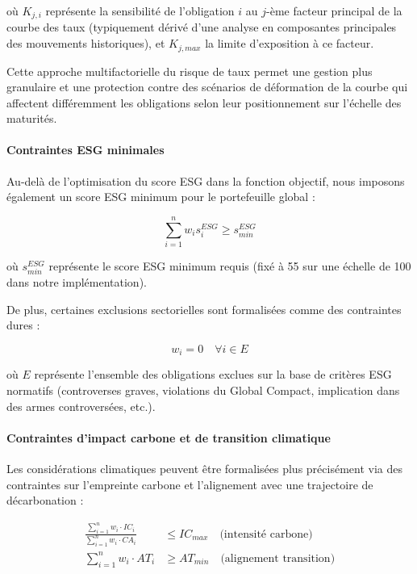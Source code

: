 où $K_{j,i}$ représente la sensibilité de l'obligation $i$ au $j$-ème facteur principal de la courbe des taux (typiquement dérivé d'une analyse en composantes principales des mouvements historiques), et $K_{j,max}$ la limite d'exposition à ce facteur.

Cette approche multifactorielle du risque de taux permet une gestion plus granulaire et une protection contre des scénarios de déformation de la courbe qui affectent différemment les obligations selon leur positionnement sur l'échelle des maturités.

\paragraph{Contraintes ESG minimales} 
Au-delà de l'optimisation du score ESG dans la fonction objectif, nous imposons également un score ESG minimum pour le portefeuille global :

\begin{equation}
\sum_{i=1}^n w_i s^{ESG}_i \geq s^{ESG}_{min}
\end{equation}

où $s^{ESG}_{min}$ représente le score ESG minimum requis (fixé à 55 sur une échelle de 100 dans notre implémentation).

De plus, certaines exclusions sectorielles sont formalisées comme des contraintes dures :

\begin{equation}
w_i = 0 \quad \forall i \in E
\end{equation}

où $E$ représente l'ensemble des obligations exclues sur la base de critères ESG normatifs (controverses graves, violations du Global Compact, implication dans des armes controversées, etc.).

\paragraph{Contraintes d'impact carbone et de transition climatique}
Les considérations climatiques peuvent être formalisées plus précisément via des contraintes sur l'empreinte carbone et l'alignement avec une trajectoire de décarbonation :

\begin{align}
\frac{\sum_{i=1}^{n} w_i \cdot IC_i}{\sum_{i=1}^{n} w_i \cdot CA_i} &\leq IC_{max} \quad \text{(intensité carbone)} \\
\sum_{i=1}^{n} w_i \cdot AT_i &\geq AT_{min} \quad \text{(alignement transition)}
\end{align}

